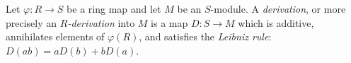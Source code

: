 \begin{definition}
\label{definition-derivation}
Let $\varphi : R \to S$ be a ring map and let $M$ be an $S$-module.
A {\it derivation}, or more precisely an
{\it $R$-derivation} into $M$ is a map $D : S \to M$
which is additive, annihilates elements of $\varphi(R)$,
and satisfies the {\it Leibniz rule}: $D(ab) = aD(b) + bD(a)$.
\end{definition}